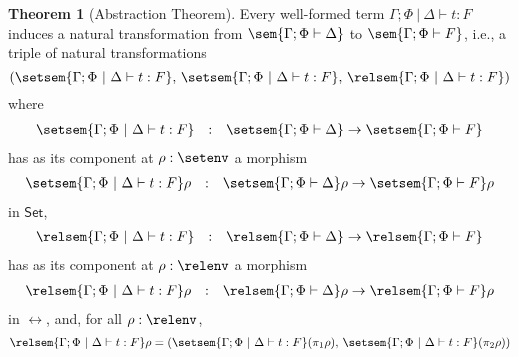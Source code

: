 \documentclass[acmsmall,review,anonymous]{acmart}
\theoremstyle{definition}
\newtheorem*{nono-theorem}{Theorem}
\newcommand{\set}{\mathsf{Set}}
\begin{document}
\begin{nono-theorem}[Abstraction Theorem]\label{thm:at-gen}
Every well-formed term $\Gamma;\Phi~|~\Delta \vdash t : F$ induces
a natural transformation from $\sem{\Gamma; \Phi \vdash \Delta}$ to
$\sem{\Gamma; \Phi \vdash F}$, i.e., a triple of natural
transformations 
\[(\setsem{\Gamma;\Phi~|~\Delta \vdash t : F},\,
\setsem{\Gamma;\Phi~|~\Delta \vdash t : F},\,
\relsem{\Gamma;\Phi~|~\Delta \vdash t : F})\]
where
\[\begin{array}{lll}
\setsem{\Gamma;\Phi~|~\Delta \vdash t : F} & : & \setsem{\Gamma;
  \Phi \vdash \Delta} \to \setsem{\Gamma; \Phi \vdash F}
\end{array}\]
has as its component at $\rho : \setenv$ a morphism
\[\begin{array}{lll}
\setsem{\Gamma;\Phi~|~\Delta \vdash t : F}\rho & : & \setsem{\Gamma;
  \Phi \vdash \Delta}\rho \to \setsem{\Gamma; \Phi \vdash F}\rho
\end{array}\]
in $\set$,
\[\begin{array}{lll}
\relsem{\Gamma;\Phi~|~\Delta \vdash t : F} & : & \relsem{\Gamma;
  \Phi \vdash \Delta} \to \relsem{\Gamma; \Phi \vdash F}
\end{array}\]
has as its component at $\rho : \relenv$ a morphism
\[\begin{array}{lll}
\relsem{\Gamma;\Phi~|~\Delta \vdash t : F}\rho & : & \relsem{\Gamma;
  \Phi \vdash \Delta}\rho \to \relsem{\Gamma; \Phi \vdash F}\rho
\end{array}\]
in $\rel$,
and, for all $\rho : \relenv$,
\begin{equation}\label{eq:projs}
\relsem{\Gamma;\Phi~|~\Delta \vdash t : F}\rho =
(\setsem{\Gamma;\Phi~|~\Delta \vdash t : F}(\pi_1 \rho),\,
\setsem{\Gamma;\Phi~|~\Delta \vdash t : F}(\pi_2 \rho))
\end{equation}
\end{nono-theorem}
\end{document}
